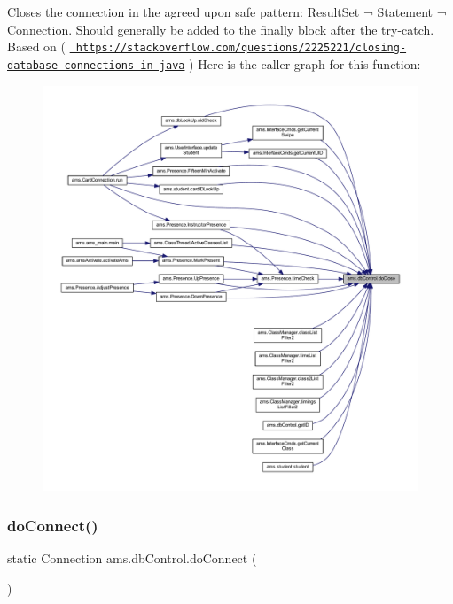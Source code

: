 Closes the connection in the agreed upon safe pattern\+: Result\+Set ¬ Statement ¬ Connection. Should generally be added to the finally block after the try-\/catch. Based on ( \href{https://stackoverflow.com/questions/2225221/closing-database-connections-in-java}{\texttt{ https\+://stackoverflow.\+com/questions/2225221/closing-\/database-\/connections-\/in-\/java}} ) Here is the caller graph for this function\+:\nopagebreak
\begin{figure}[H]
\begin{center}
\leavevmode
\includegraphics[width=350pt]{classams_1_1db_control_ade1a4d8aaeedb1ae1f32a0e629aa09aa_icgraph}
\end{center}
\end{figure}
\mbox{\label{classams_1_1db_control_a76fc97489ad6acec2ec72d644e935362}} 
\subsubsection{\texorpdfstring{doConnect()}{doConnect()}}
{\footnotesize\ttfamily static Connection ams.\+db\+Control.\+do\+Connect (\begin{DoxyParamCaption}{ }\end{DoxyParamCaption})\hspace{0.3cm}{\ttfamily [static]}}

